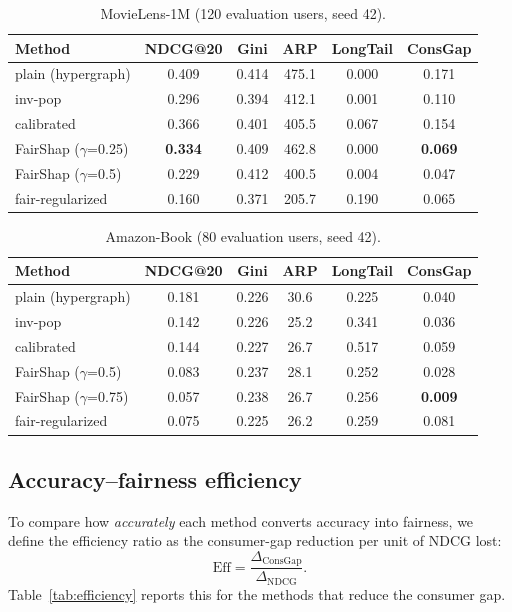 \documentclass[pdflatex,sn-mathphys-num]{sn-jnl}%
\theoremstyle{thmstyleone}%
\theoremstyle{thmstyletwo}%
\theoremstyle{thmstylethree}%
\begin{document}
\begin{table}[h]
\caption{MovieLens-1M (120 evaluation users, seed 42).}
\label{tab:ml1m}
\centering
\small
\begin{tabular}{lccccc}
\toprule
Method & NDCG@20 & Gini & ARP & LongTail & ConsGap \\
\midrule
plain (hypergraph) & 0.409 & 0.414 & 475.1 & 0.000 & 0.171 \\
inv-pop & 0.296 & 0.394 & 412.1 & 0.001 & 0.110 \\
calibrated & 0.366 & 0.401 & 405.5 & 0.067 & 0.154 \\
FairShap ($\gamma$=0.25) & \textbf{0.334} & 0.409 & 462.8 & 0.000 & \textbf{0.069} \\
FairShap ($\gamma$=0.5) & 0.229 & 0.412 & 400.5 & 0.004 & 0.047 \\
fair-regularized & 0.160 & 0.371 & 205.7 & 0.190 & 0.065 \\
\bottomrule
\end{tabular}
\end{table}

\begin{table}[h]
\caption{Amazon-Book (80 evaluation users, seed 42).}
\label{tab:amazon}
\centering
\small
\begin{tabular}{lccccc}
\toprule
Method & NDCG@20 & Gini & ARP & LongTail & ConsGap \\
\midrule
plain (hypergraph) & 0.181 & 0.226 & 30.6 & 0.225 & 0.040 \\
inv-pop & 0.142 & 0.226 & 25.2 & 0.341 & 0.036 \\
calibrated & 0.144 & 0.227 & 26.7 & 0.517 & 0.059 \\
FairShap ($\gamma$=0.5) & 0.083 & 0.237 & 28.1 & 0.252 & 0.028 \\
FairShap ($\gamma$=0.75) & 0.057 & 0.238 & 26.7 & 0.256 & \textbf{0.009} \\
fair-regularized & 0.075 & 0.225 & 26.2 & 0.259 & 0.081 \\
\bottomrule
\end{tabular}
\end{table}

\subsection{Accuracy--fairness efficiency}
To compare how \emph{accurately} each method converts accuracy into fairness, we define the efficiency ratio as the consumer-gap reduction per unit of NDCG lost:
\begin{equation}\label{eq:efficiency}
\mathrm{Eff}=\frac{\Delta_{\mathrm{ConsGap}}}{\Delta_{\mathrm{NDCG}}}.
\end{equation}
Table~\ref{tab:efficiency} reports this for the methods that reduce the consumer gap.
\end{document}
